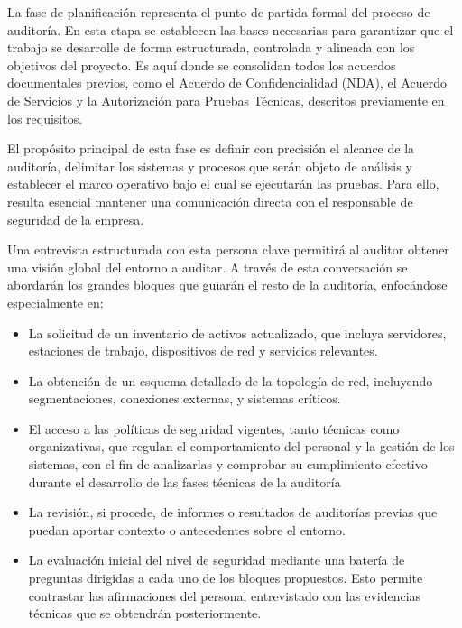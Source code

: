 \documentclass[a4paper, 11pt]{article}
\begin{document}
La fase de planificación representa el punto de partida formal del proceso de auditoría. En esta etapa se establecen las bases necesarias para garantizar que el trabajo se desarrolle de forma estructurada, controlada y alineada con los objetivos del proyecto. Es aquí donde se consolidan todos los acuerdos documentales previos, como el Acuerdo de Confidencialidad (NDA), el Acuerdo de Servicios y la Autorización para Pruebas Técnicas, descritos previamente en los requisitos.
\par\vspace{0.5cm}

El propósito principal de esta fase es definir con precisión el alcance de la auditoría, delimitar los sistemas y procesos que serán objeto de análisis y establecer el marco operativo bajo el cual se ejecutarán las pruebas. Para ello, resulta esencial mantener una comunicación directa con el responsable de seguridad de la empresa.
\par\vspace{0.5cm}

Una entrevista estructurada con esta persona clave permitirá al auditor obtener una visión global del entorno a auditar. A través de esta conversación se abordarán los grandes bloques que guiarán el resto de la auditoría, enfocándose especialmente en:

\begin{itemize}
\item La solicitud de un inventario de activos actualizado, que incluya servidores, estaciones de trabajo, dispositivos de red y servicios relevantes.
\item La obtención de un esquema detallado de la topología de red, incluyendo segmentaciones, conexiones externas, y sistemas críticos.
\item El acceso a las políticas de seguridad vigentes, tanto técnicas como organizativas, que regulan el comportamiento del personal y la gestión de los sistemas, con el fin de analizarlas y comprobar su cumplimiento
efectivo durante el desarrollo de las fases técnicas de la auditoría
\item La revisión, si procede, de informes o resultados de auditorías previas que puedan aportar contexto o antecedentes sobre el entorno.
\item La evaluación inicial del nivel de seguridad mediante una batería de preguntas dirigidas a cada uno de los bloques propuestos. Esto permite contrastar las afirmaciones del personal entrevistado con las evidencias técnicas que se obtendrán posteriormente.
\end{itemize}
\end{document}
